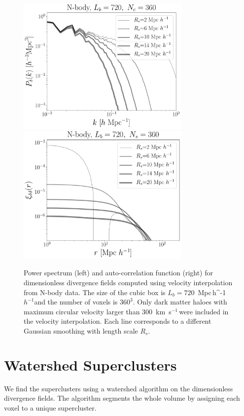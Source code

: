\documentclass[usenatbib]{mnras}
\newcommand{\Mpch}{\,{\rm Mpc}\,\ifmmode h^{-1}\else $h^{-1}$\fi}
\newcommand{\kms}{\,{\rm km}\ s$^{-1}$\,}
\begin{document}
\begin{figure}
    \centering
    \includegraphics[width=240pt]{power_spectrum_nbody_720_360.pdf}
    \includegraphics[width=240pt]{corr_func_nbody_720_360.pdf}
    \caption{Power spectrum (left) and auto-correlation function (right) for dimensionless divergence fields computed using velocity interpolation from N-body data.
    The size of the cubic box is $L_b=720$ \Mpch and the number of voxels is $360^3$.
    Only dark matter haloes with maximum circular velocity larger than $300$ \kms were included in the velocity interpolation.
    Each line corresponds to a different Gaussian smoothing with length scale $R_s$.}
    \label{fig:nbody}
\end{figure}



\section{Watershed Superclusters}
\label{sec:watershed}

We find the superclusters using a watershed algorithm \citep{BeucherWatershed1979} on the dimensionless divergence fields.
The algorithm segments the whole volume by assigning each voxel to a unique supercluster. 
\end{document}
